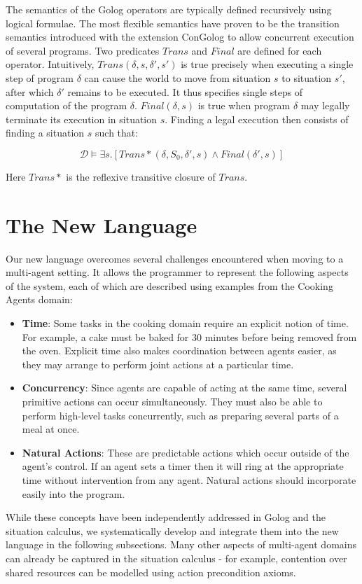 \documentclass{llncs}
\begin{document}
The semantics of the Golog operators are typically defined recursively
using logical formulae. The most flexible semantics have proven to
be the transition semantics introduced with the extension ConGolog
\cite{giacomo00congolog} to allow concurrent execution of several
programs. Two predicates $Trans$ and $Final$ are defined for each
operator. Intuitively, $Trans(\delta,s,\delta',s')$ is true precisely
when executing a single step of program $\delta$ can cause the world
to move from situation $s$ to situation $s'$, after which $\delta'$
remains to be executed. It thus specifies single steps of computation
of the program $\delta$. $Final(\delta,s)$ is true when program
$\delta$ may legally terminate its execution in situation $s$. Finding
a legal execution then consists of finding a situation $s$ such that:

\[
\mathcal{D}\models\exists s.\left[Trans*(\delta,S_{0},\delta',s)\wedge Final(\delta',s)\right]
\]


Here $Trans*$ is the reflexive transitive closure of $Trans$.


\section{The New Language}

\label{sec:Language-Features}

Our new language overcomes several challenges encountered when moving
to a multi-agent setting. It allows the programmer to represent the
following aspects of the system, each of which are described using
examples from the Cooking Agents domain:

\begin{itemize}
\item \textbf{Time}: Some tasks in the cooking domain require an explicit
notion of time. For example, a cake must be baked for 30 minutes before
being removed from the oven. Explicit time also makes coordination
between agents easier, as they may arrange to perform joint actions
at a particular time.
\item \textbf{Concurrency}: Since agents are capable of acting at the same
time, several primitive actions can occur simultaneously. They must
also be able to perform high-level tasks concurrently, such as preparing
several parts of a meal at once.
\item \textbf{Natural Actions}: These are predictable actions which occur
outside of the agent's control. If an agent sets a timer then it will
ring at the appropriate time without intervention from any agent.
Natural actions should incorporate easily into the program.
\end{itemize}
While these concepts have been independently addressed in Golog and
the situation calculus, we systematically develop and integrate them
into the new language in the following subsections. Many other aspects
of multi-agent domains can already be captured in the situation calculus
- for example, contention over shared resources can be modelled using
action precondition axioms.
\end{document}
